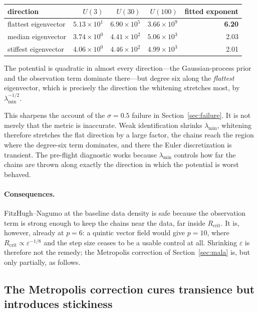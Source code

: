 \documentclass[11pt]{article}
\begin{document}
\begin{center}
\begin{tabular}{lrrrr}
\toprule
direction & $U(3)$ & $U(30)$ & $U(100)$ & fitted exponent \\
\midrule
flattest eigenvector & $5.13\times10^{1}$ & $6.90\times10^{5}$ & $3.66\times10^{9}$ & \textbf{6.20} \\
median eigenvector   & $3.74\times10^{0}$ & $4.41\times10^{2}$ & $5.06\times10^{3}$ & 2.03 \\
stiffest eigenvector & $4.06\times10^{0}$ & $4.46\times10^{2}$ & $4.99\times10^{3}$ & 2.01 \\
\bottomrule
\end{tabular}
\end{center}

The potential is quadratic in almost every direction---the Gaussian-process prior and the
observation term dominate there---but degree six along the \emph{flattest} eigenvector, which is
precisely the direction the whitening stretches most, by $\lambda_{\min}^{-1/2}$.

This sharpens the account of the $\sigma = 0.5$ failure in Section~\ref{sec:failure}. It is not
merely that the metric is inaccurate. Weak identification shrinks $\lambda_{\min}$, whitening
therefore stretches the flat direction by a large factor, the chains reach the region where the
degree-six term dominates, and there the Euler discretization is transient. The pre-flight
diagnostic works because $\lambda_{\min}$ controls how far the chains are thrown along exactly
the direction in which the potential is worst behaved.

\paragraph{Consequences.} FitzHugh--Nagumo at the baseline data density is safe because the
observation term is strong enough to keep the chains near the data, far inside $R_{\text{crit}}$.
It is, however, already at $p=6$: a quintic vector field would give $p=10$, where
$R_{\text{crit}} \propto \varepsilon^{-1/8}$ and the step size ceases to be a usable control at
all. Shrinking $\varepsilon$ is therefore not the remedy; the Metropolis correction of
Section~\ref{sec:mala} is, but only partially, as follows.

\subsection{The Metropolis correction cures transience but introduces stickiness}
\label{sec:sticky}
\end{document}
